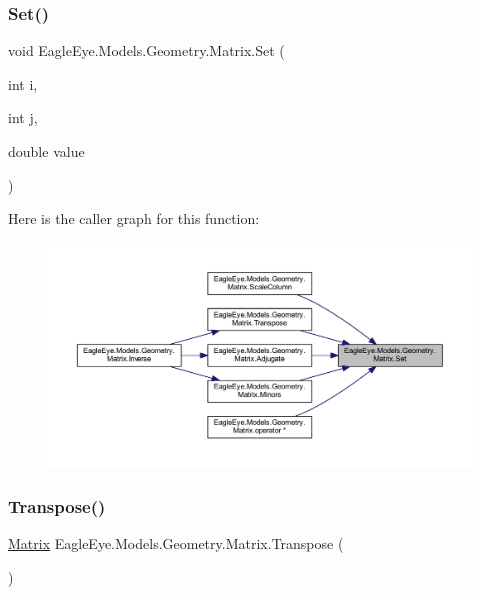 \subsubsection{\texorpdfstring{Set()}{Set()}}
{\footnotesize\ttfamily void Eagle\+Eye.\+Models.\+Geometry.\+Matrix.\+Set (\begin{DoxyParamCaption}\item[{int}]{i,  }\item[{int}]{j,  }\item[{double}]{value }\end{DoxyParamCaption})}

Here is the caller graph for this function\+:\nopagebreak
\begin{figure}[H]
\begin{center}
\leavevmode
\includegraphics[width=350pt]{class_eagle_eye_1_1_models_1_1_geometry_1_1_matrix_aeebb46e5118b02be93b0c75df62ff1ef_icgraph}
\end{center}
\end{figure}
\mbox{\label{class_eagle_eye_1_1_models_1_1_geometry_1_1_matrix_ac0d40e692ec3157a7fc034a3b01447e5}} 
\subsubsection{\texorpdfstring{Transpose()}{Transpose()}}
{\footnotesize\ttfamily \mbox{\hyperlink{class_eagle_eye_1_1_models_1_1_geometry_1_1_matrix}{Matrix}} Eagle\+Eye.\+Models.\+Geometry.\+Matrix.\+Transpose (\begin{DoxyParamCaption}{ }\end{DoxyParamCaption})}

